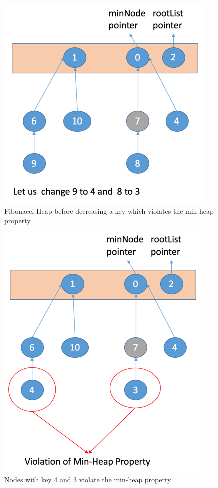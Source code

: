 \begin{figure}[h]
	\centering 
	\includegraphics[width=0.95\columnwidth,height=0.75\columnwidth ]{Figures/FibonacciHeapDecreaseKeyVilolation1Operation}
	\caption{Fibonacci Heap before decreasing a key which violates the min-heap property}
	\label {fig:decreaseKey1Violation}
\end{figure}
\begin{figure}[h]
	\centering 
	\includegraphics[width=0.95\columnwidth,height=0.75\columnwidth]{Figures/FibonacciHeapDecreaseKeyVilolation2Operation}
	\caption{Nodes with key 4 and 3 violate the min-heap property}
	\label {fig:decreaseKey2Violation}
\end{figure}
